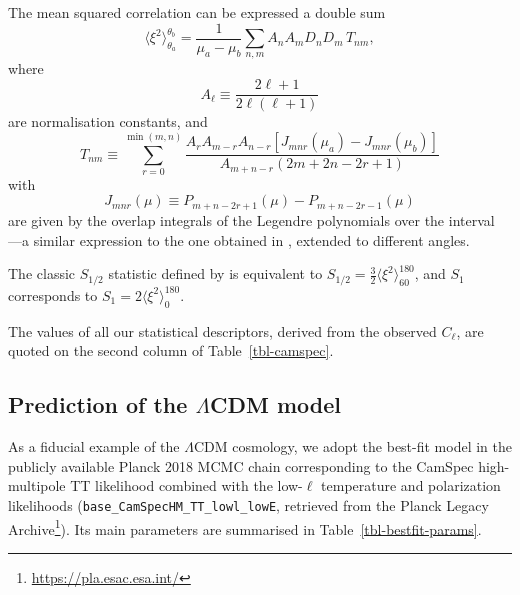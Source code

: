 \documentclass[apj,twocolumn,numberedappendix]{openjournal}
\begin{document}
The mean squared correlation can be expressed a double sum
 \begin{equation}\label{eq-sum-xi2}
\langle\xi^2\rangle_{\theta_a}^{\theta_b}
=
\frac{ 1 }{ \mu_a - \mu_b }
\sum_{n,m} A_n A_m D_n D_m\, T_{nm},
\end{equation}
where %
\begin{equation}
A_\ell \equiv \frac{ 2\ell+1 }{ 2\ell(\ell+1) }
\end{equation}
are normalisation constants, and
\begin{equation}
T_{nm} \equiv\!\!\! \sum_{r=0}^{\min(m,n)}\!\!
\frac
{ A_r A_{m-r} A_{n-r} [ J_{mnr}(\mu_a) - J_{mnr}(\mu_b) ] }
{ A_{m+n-r}(2m+2n-2r+1) }
\end{equation}
with
\begin{equation}
J_{mnr}(\mu)\! \equiv P_{m+n-2r+1}(\mu) - P_{m+n-2r-1}(\mu)
\end{equation}
are given by the overlap integrals of the Legendre polynomials over the interval \citep{Carlitz1961}---a similar expression to the one obtained in \citep{Copi2009}, extended to different angles.

The classic $S_{1/2}$ statistic defined by \citet{Spergel_2003} is equivalent to
$S_{1/2} = \frac{3}{2} \langle\xi^2\rangle_{60}^{180}$, and $S_1$ \citep{Gruppuso2014} corresponds to $S_1 = 2 \langle\xi^2\rangle_{0}^{180}$.

The values of all our statistical descriptors, derived from the observed $C_\ell$, are quoted on the second column of Table~\ref{tbl-camspec}.


\subsection{Prediction of the $\Lambda$CDM model}

As a fiducial example of the $\Lambda$CDM cosmology, we adopt the best-fit model in the publicly available Planck 2018 MCMC chain corresponding to the CamSpec high-multipole TT likelihood combined with the low-$\ell$ temperature and polarization likelihoods (\texttt{base\_CamSpecHM\_TT\_lowl\_lowE}, retrieved from the Planck Legacy Archive\footnote{\url{https://pla.esac.esa.int/}}).
Its main parameters are summarised in Table~\ref{tbl-bestfit-params}.
\end{document}
